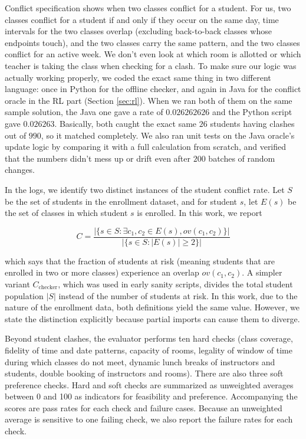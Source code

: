 \documentclass[journal]{IEEEtran}
\begin{document}
Conflict specification shows when two classes conflict for a student. For us, two classes conflict for a student if and only if they occur on the same day, time intervals for the two classes overlap (excluding back-to-back classes whose endpoints touch), and the two classes carry the same pattern, and the two classes conflict for an active week. We don't even look at which room is allotted or which teacher is taking the class when checking for a clash. To make sure our logic was actually working properly, we coded the exact same thing in two different language: once in Python for the offline checker, and again in Java for the conflict oracle in the RL part (Section \ref{sec:rl}). When we ran both of them on the same sample solution, the Java one gave a rate of $0.026262626$ and the Python script gave $0.026263$. Basically, both caught the exact same $26$ students having clashes out of $990$, so it matched completely. We also ran unit tests on the Java oracle's update logic by comparing it with a full calculation from scratch, and verified that the numbers didn't mess up or drift even after $200$ batches of random changes.

In the logs, we identify two distinct instances of the student conflict rate. Let $S$ be the set of students in the enrollment dataset, and for student $s$, let $E(s)$ be the set of classes in which student $s$ is enrolled. In this work, we report

\begin{equation}
C = \frac{|\{s\in S : \exists c_1,c_2 \in E(s), ov(c_1,c_2)\}|}{|\{s \in S : |E(s)| \geq 2 \}|}
\end{equation}

which says that the fraction of students at risk (meaning students that are enrolled in two or more classes) experience an overlap $ov(c_1, c_2)$. A simpler variant $C_{\text{checker}}$, which was used in early sanity scripts, divides the total student population $|S|$ instead of the number of students at risk. In this work, due to the nature of the enrollment data, both definitions yield the same value. However, we state the distinction explicitly because partial imports can cause them to diverge.

Beyond student clashes, the evaluator performs ten hard checks (class coverage, fidelity of time and date patterns, capacity of rooms, legality of window of time during which classes do not meet, dynamic lunch breaks of instructors and students, double booking of instructors and rooms). There are also three soft preference checks. Hard and soft checks are summarized as unweighted averages between 0 and 100 as indicators for feasibility and preference. Accompanying the scores are pass rates for each check and failure cases. Because an unweighted average is sensitive to one failing check, we also report the failure rates for each check.
\end{document}
